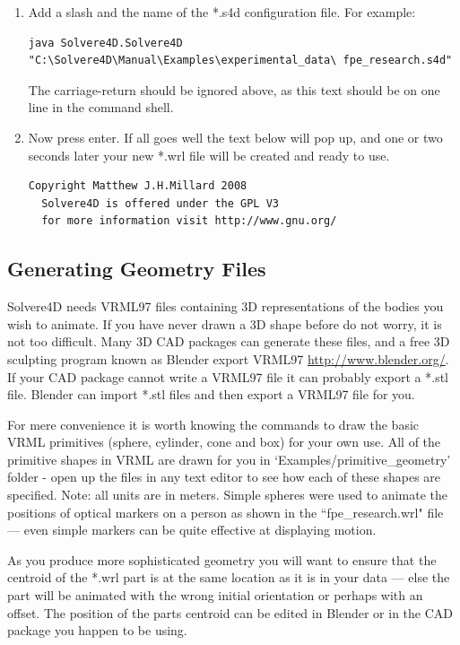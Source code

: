 \documentclass[singlecolumn,12pt]{article}
\begin{document}
\begin{enumerate}
\item Add a slash and the name of the *.s4d configuration file. For
example:


\footnotesize
\begin{verbatim}
java Solvere4D.Solvere4D
"C:\Solvere4D\Manual\Examples\experimental_data\ fpe_research.s4d"
\end{verbatim}
\normalsize

The carriage-return should be ignored above, as this text should be
on one line in the command shell.


\item Now press enter. If all goes well the text below will pop up,
and one or two seconds later your new *.wrl file will be created and
ready to use.

\footnotesize
\begin{verbatim}
Copyright Matthew J.H.Millard 2008
  Solvere4D is offered under the GPL V3
  for more information visit http://www.gnu.org/
\end{verbatim}
\normalsize


\end{enumerate}


\subsection{Generating Geometry Files}

Solvere4D needs VRML97 files containing 3D representations of the
bodies you wish to animate. If you have never drawn a 3D shape
before do not worry, it is not too difficult. Many 3D CAD packages
can generate these files, and a free 3D sculpting program known as
Blender export VRML97 \url{http://www.blender.org/}. If your CAD
package cannot write a VRML97 file it can probably export a *.stl
file. Blender can import *.stl files and then export a VRML97 file
for you.

For mere convenience it is worth knowing the commands to draw the
basic VRML primitives (sphere, cylinder, cone and box) for your own
use. All of the primitive shapes in VRML are drawn for you in
`Examples/primitive\_geometry' folder - open up the files in any
text editor to see how each of these shapes are specified. Note: all
units are in meters. Simple spheres were used to animate the
positions of optical markers on a person as shown in the
``fpe\_research.wrl" file --- even simple markers can be quite
effective at displaying motion.

As you produce more sophisticated geometry you will want to ensure
that the centroid of the *.wrl part is at the same location as it is
in your data --- else the part will be animated with the wrong
initial orientation or perhaps with an offset. The position of the
parts centroid can be edited in Blender or in the CAD package you
happen to be using.
\end{document}
